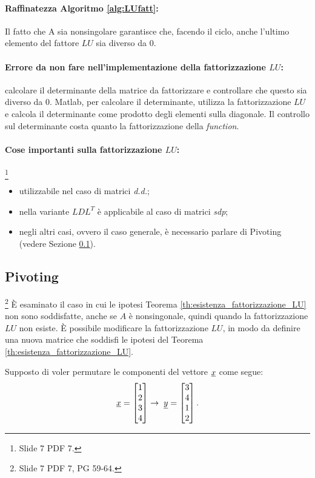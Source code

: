 \paragraph{Raffinatezza Algoritmo \ref{alg:LUfatt}:} Il fatto che A sia \gls{nonsingolare} garantisce che, facendo il ciclo, anche l'ultimo elemento del fattore $LU$ sia diverso da 0.

\paragraph{Errore da non fare nell'implementazione della fattorizzazione $LU$:} calcolare il determinante della matrice da fattorizzare e controllare che questo sia diverso da 0. Matlab, per calcolare il determinante, utilizza la fattorizzazione $LU$ e calcola il determinante come prodotto degli elementi sulla diagonale. Il controllo sul determinante costa quanto la fattorizzazione della \textit{function}.

\paragraph{Cose importanti sulla fattorizzazione $LU$:}\footnote{Slide 7 PDF 7.}
\begin{itemize}
    \item utilizzabile nel caso di matrici \textit{d.d.};
    \item nella variante $LDL^T$ è applicabile al caso di matrici \textit{sdp};
    \item negli altri casi, ovvero il caso generale, è necessario parlare di Pivoting (vedere Sezione \ref{ssec:pivoting}).
\end{itemize}

\subsection{Pivoting}\label{ssec:pivoting}
\footnote{Slide 7 PDF 7, PG 59-64.}
È esaminato il caso in cui le ipotesi Teorema \ref{th:esistenza_fattorizzazione_LU} non sono soddisfatte, anche se $A$ è nonsingonale, quindi quando la fattorizzazione $LU$ non esiste. È possibile modificare la fattorizzazione $LU$, in modo da definire una nuova matrice che soddisfi le ipotesi del Teorema \ref{th:esistenza_fattorizzazione_LU}.

Supposto di voler permutare le componenti del vettore $\uline x$ come segue:
\begin{equation*}
        \uline x=
        \begin{bmatrix}
            1\\
            2\\
            3\\
            4
        \end{bmatrix}\rightarrow\; \uline y=
        \begin{bmatrix}
            3\\
            4\\
            1\\
            2
        \end{bmatrix}.
\end{equation*}

